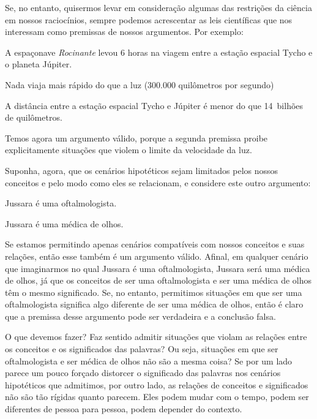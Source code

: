 Se, no entanto, quisermos levar em consideração algumas das restrições da ciência em nossos raciocínios, sempre podemos acrescentar as leis científicas que nos interessam como premissas de nossos argumentos.
Por exemplo:
	\begin{earg}
		\item[] A espaçonave \emph{Rocinante} levou 6 horas na viagem entre a estação espacial Tycho e o planeta Júpiter.
		\item[] Nada viaja mais rápido do que a luz (300.000 quilômetros por segundo)
		\item[\therefore] A distância entre a estação espacial Tycho e Júpiter é menor do que 14~bilhões de quilômetros.
	\end{earg}
Temos agora um argumento válido, porque a segunda premissa proibe explicitamente situações que violem o limite da velocidade da luz.

Suponha, agora, que os cenários hipotéticos sejam limitados pelos nossos conceitos e pelo modo como eles se relacionam, e considere este outro argumento:
	\begin{earg}
		\item[] Jussara é uma oftalmologista.
		\item[\therefore] Jussara é uma médica de olhos.
	\end{earg}
Se estamos permitindo apenas cenários compatíveis com nossos conceitos e suas relações, então esse também é um argumento válido.
Afinal, em qualquer cenário que imaginarmos no qual Jussara é uma oftalmologista, Jussara será uma médica de olhos, já que os conceitos de ser uma oftalmologista e ser uma médica de olhos têm o mesmo significado.
Se, no entanto, permitimos situações em que ser uma oftalmologista significa algo diferente de ser uma médica de olhos, então é claro que a premissa desse argumento pode ser verdadeira e a conclusão falsa.

O que devemos fazer?
Faz sentido admitir situações que violam as relações entre os conceitos e os significados das palavras?
Ou seja, situações em que ser oftalmologista e ser médica de olhos não são a mesma coisa?
Se por um lado parece um pouco forçado distorcer o significado das palavras nos cenários hipotéticos que admitimos, por outro lado, as relações de conceitos e significados  não são tão rígidas quanto parecem.
Eles podem mudar com o tempo, podem ser diferentes de pessoa para pessoa, podem depender do contexto.

